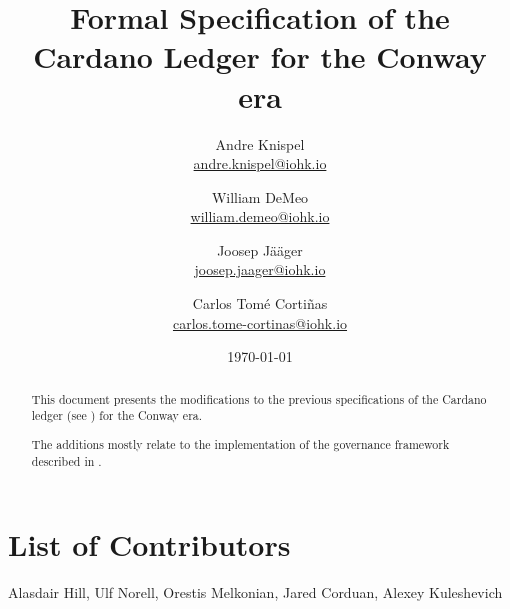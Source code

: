 \documentclass[11pt,a4paper,dvipsnames]{article}
\begin{document}
\title{Formal Specification of the Cardano Ledger for the Conway era}

\author{%
  Andre Knispel \\ {\small \href{mailto:andre.knispel@iohk.io}{andre.knispel@iohk.io}}
  \and
  William DeMeo \\ {\small \href{mailto:william.demeo@iohk.io}{william.demeo@iohk.io}}
  \and
  Joosep Jääger \\ {\small \href{mailto:joosep.jaager@iohk.io}{joosep.jaager@iohk.io}}
  \and
  Carlos Tom\'{e} Corti\~{n}as \\ {\small \href{mailto:carlos.tome-cortinas@iohk.io}{carlos.tome-cortinas@iohk.io}}
}

\date{\today}

\maketitle

\begin{abstract}
  This document presents the modifications to the previous
  specifications of the Cardano ledger (see
  \cite{shelley-ledger-spec,shelley-ma-ledger-spec,alonzo-ledger-spec,babbage-ledger-spec})
  for the Conway era.

  The additions mostly relate to the implementation of the governance
  framework described in \cite{cip1694}.
\end{abstract}

\section*{List of Contributors}
\label{acknowledgements}

Alasdair Hill, Ulf Norell, Orestis Melkonian, Jared Corduan, Alexey Kuleshevich

\tableofcontents



















\clearpage

\appendix




\end{document}
